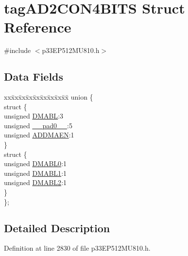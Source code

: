 \hypertarget{structtag_a_d2_c_o_n4_b_i_t_s}{}\section{tag\+A\+D2\+C\+O\+N4\+B\+I\+TS Struct Reference}
\label{structtag_a_d2_c_o_n4_b_i_t_s}


{\ttfamily \#include $<$p33\+E\+P512\+M\+U810.\+h$>$}

\subsection*{Data Fields}
\begin{DoxyCompactItemize}
\item 
\begin{tabbing}
xx\=xx\=xx\=xx\=xx\=xx\=xx\=xx\=xx\=\kill
union \{\\
\>struct \{\\
\>\>unsigned \hyperlink{structtag_a_d2_c_o_n4_b_i_t_s_adda9d3ba481141ac9208738397c425fb}{DMABL}:3\\
\>\>unsigned \hyperlink{structtag_a_d2_c_o_n4_b_i_t_s_adf71f3d8410c1f1dbbc96680a92c49af}{\_\_pad0\_\_}:5\\
\>\>unsigned \hyperlink{structtag_a_d2_c_o_n4_b_i_t_s_a44d0e5a2f84a06b3ea34f28e3e7afb78}{ADDMAEN}:1\\
\>\} \\
\>struct \{\\
\>\>unsigned \hyperlink{structtag_a_d2_c_o_n4_b_i_t_s_acda72d244c5eeafabf18f267851b89a1}{DMABL0}:1\\
\>\>unsigned \hyperlink{structtag_a_d2_c_o_n4_b_i_t_s_ae313e43c24c80a35a2ec07db385edf09}{DMABL1}:1\\
\>\>unsigned \hyperlink{structtag_a_d2_c_o_n4_b_i_t_s_ab3ae1ef64c4b8d25608d31a00b64f93d}{DMABL2}:1\\
\>\} \\
\}; \\

\end{tabbing}\end{DoxyCompactItemize}


\subsection{Detailed Description}


Definition at line 2830 of file p33\+E\+P512\+M\+U810.\+h.



